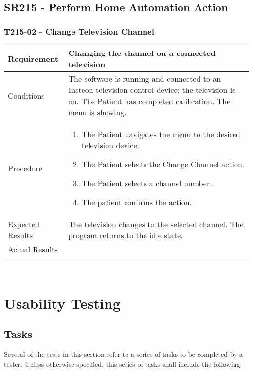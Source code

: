 \documentclass{article}
\begin{document}
\subsection{SR215 - Perform Home Automation Action}
\subsubsection{T215-02 - Change Television Channel}
\begin{tabular}{| l | p{12cm} |}
    \hline
	Requirement & Changing the channel on a connected television \\ \hline
	Conditions & The software is running and connected to an Insteon
	television control device; the television is on. The Patient has completed
	calibration. The menu is showing. \\
	\hline
	Procedure &
\begin{enumerate}
	\item The Patient navigates the menu to the desired television device.
	\item The Patient selects the Change Channel action.
	\item The Patient selects a channel number.
	\item The patient confirms the action.
\end{enumerate} \\ \hline
	Expected Results & The television changes to the selected channel. The
    program returns to the idle state. \\ \hline
	Actual Results & \vspace{1cm} \\ \hline
\end{tabular}

\hfill \\

\newpage

\section{Usability Testing}
\subsection{Tasks}

Several of the tests in this section refer to a series of tasks to be
completed by a tester. Unless otherwise specified, this series of tasks shall
include the following:
\end{document}
